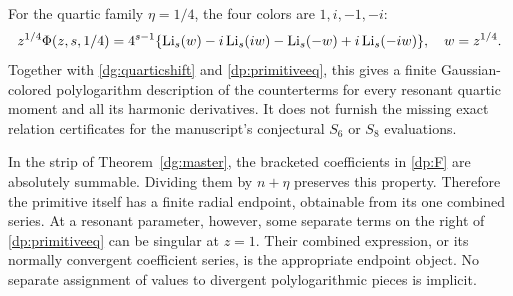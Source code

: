 For the quartic family $\eta=1/4$, the four colors are $1,i,-1,-i$:
\begin{equation}\label{dp:quarterfilter}
 z^{1/4}\Phi(z,s,1/4)=4^{s-1}
 \{\operatorname{Li}_s(w)-i\operatorname{Li}_s(iw)-\operatorname{Li}_s(-w)+i\operatorname{Li}_s(-iw)\},
 \quad w=z^{1/4}.
\end{equation}
Together with \eqref{dg:quarticshift} and
\eqref{dp:primitiveeq}, this gives a finite Gaussian-colored
polylogarithm description of the counterterms for every resonant
quartic moment and all its harmonic derivatives. It does not furnish
the missing exact relation certificates for the manuscript's
conjectural $S_6$ or $S_8$ evaluations.

\begin{remark}\label{dp:boundary}
In the strip of Theorem~\ref{dg:master}, the bracketed coefficients
in \eqref{dp:F} are absolutely summable. Dividing them by
$n+\eta$ preserves this property. Therefore the primitive itself has
a finite radial endpoint, obtainable from its one combined series.
At a resonant parameter, however, some separate terms on the right of
\eqref{dp:primitiveeq} can be singular at $z=1$. Their combined
expression, or its normally convergent coefficient series, is the
appropriate endpoint object. No separate assignment of values to
divergent polylogarithmic pieces is implicit.
\end{remark}
